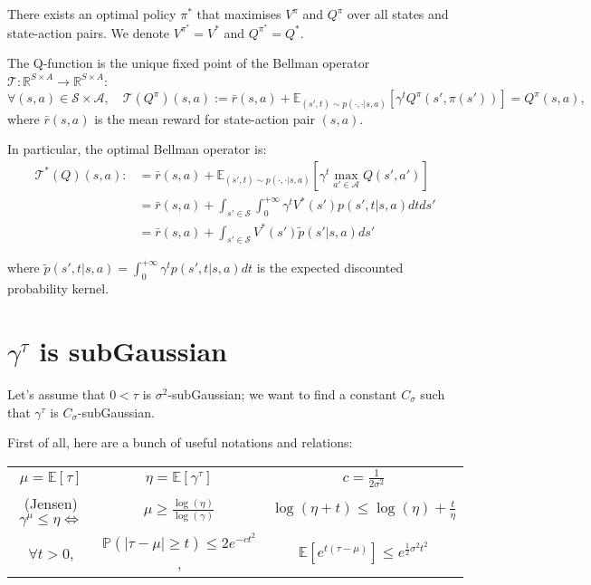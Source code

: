 \documentclass{article}
\begin{document}
There exists an optimal policy $\pi^*$ that maximises $V^{\pi}$ and $Q^{\pi}$ over all states and state-action pairs. We denote $V^{\pi^*} = V^*$ and $Q^{\pi^*} = Q^*$.

The Q-function is the unique fixed point of the Bellman operator $\mathcal{T}: \mathbb{R}^{S \times A} \to \mathbb{R}^{S \times A}$:
$$\forall (s, a) \in \mathcal{S} \times \mathcal{A}, \quad \mathcal{T}(Q^{\pi})(s, a) := \bar r(s, a) + \mathbb{E}_{(s', t) \sim p(\cdot, \cdot | s, a)} \left[ \gamma^t Q^{\pi}(s', \pi(s')) \right] = Q^{\pi}(s, a),$$
where $\bar r(s, a)$ is the mean reward for state-action pair $(s, a)$.

In particular, the optimal Bellman operator is:
\begin{align*}
  \mathcal{T^*}(Q)(s, a) :&= \bar r(s, a) + \mathbb{E}_{(s', t) \sim p(\cdot, \cdot | s, a)} \left[ \gamma^t \max_{a' \in \mathcal{A}} Q(s', a') \right]\\
  &= \bar r(s, a) + \int_{s' \in \mathcal{S}} \int_0^{+ \infty} \gamma^t V^*(s') p(s', t | s, a) dt ds' \\
  &= \bar r(s, a) + \int_{s' \in \mathcal{S}} V^*(s') \tilde p(s' | s, a) ds'
\end{align*}

where $\tilde p(s', t | s, a) = \int_0^{+\infty} \gamma^t p(s', t | s, a) dt$ is the expected discounted probability kernel.


\section{$\gamma^{\tau}$ is subGaussian}

Let's assume that $0 < \tau$ is $\sigma^2$-subGaussian; we want to find a constant $C_{\sigma}$ such that $\gamma^\tau$ is $C_{\sigma}$-subGaussian.

First of all, here are a bunch of useful notations and relations:\\
\begin{tabular}{c c c}
  $\mu = \mathbb{E}[\tau]$ & $\eta = \mathbb{E}[\gamma^\tau]$ & $c = \frac{1}{2 \sigma^2}$\\[.3cm]
  (Jensen) $\gamma^\mu \leq \eta \iff$ & $\mu \geq \frac{\log(\eta)}{\log(\gamma)}$ & $\log(\eta + t) \leq \log(\eta) + \frac{t}{\eta}$\\[.3cm]
  $\forall t > 0$, & $\mathbb{P}(|\tau - \mu | \geq t) \leq 2 e^{-c t^2}$, & $\mathbb{E}[e^{t(\tau - \mu)}] \leq e^{\frac{1}{2}\sigma^2 t^2}$
\end{tabular}
\end{document}
